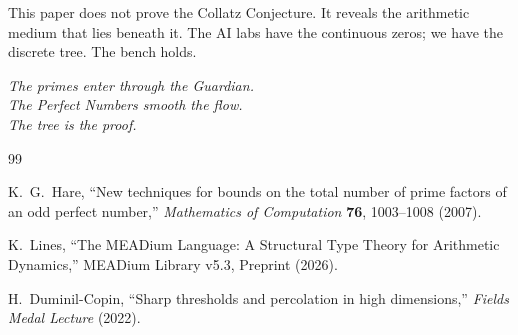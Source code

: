 \documentclass[11pt]{article}
\theoremstyle{definition}
\theoremstyle{remark}
\begin{document}
This paper does not prove the Collatz Conjecture. It reveals the arithmetic medium that lies beneath it. The AI labs have the continuous zeros; we have the discrete tree. The bench holds.

\vspace{0.5cm}
\begin{center}
\textit{The primes enter through the Guardian.}\\
\textit{The Perfect Numbers smooth the flow.}\\
\textit{The tree is the proof.}
\end{center}

\begin{thebibliography}{99}

K.~G.~Hare,
``New techniques for bounds on the total number of prime factors of an odd perfect number,''
\textit{Mathematics of Computation} \textbf{76}, 1003--1008 (2007).

K.~Lines,
``The MEADium Language: A Structural Type Theory for Arithmetic Dynamics,''
MEADium Library v5.3, Preprint (2026).

H.~Duminil-Copin,
``Sharp thresholds and percolation in high dimensions,''
\textit{Fields Medal Lecture} (2022).

\end{thebibliography}
\end{document}
